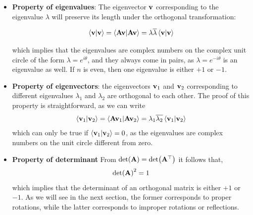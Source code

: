 \documentclass[12pt]{article}
\begin{document}
\begin{itemize}
  \item \textbf{Property of eigenvalues}: The eigenvector $\vb{v}$ corresponding to the
        eigenvalue $\lambda$ will preserve its length under the orthogonal transformation:

        \[
          \ip{\vb{v}}{\vb{v}} = \ip{\vb{A}\vb{v}}{\vb{A}\vb{v}} = \lambda\overline{\lambda}\ip{\vb{v}}{\vb{v}}
        \]

        which implies that the eigenvalues are complex numbers on the complex unit circle of
        the form $\lambda = e^{i\theta}$, and they always come in pairs, as
        $\lambda = e^{-i\theta}$ is an eigenvalue as well. If $n$ is even, then one eigenvalue
        is either $+1$ or $-1$.

  \item \textbf{Property of eigenvectors}: the eigenvectors $\vb{v}_1$ and $\vb{v}_2$
        corresponding to different eigenvalues $\lambda_1$ and $\lambda_2$ are orthogonal to
        each other. The proof of this property is straightforward, as we can write
        \[
          \ip{\vb{v}_1}{\vb{v}_2} = \ip{\vb{A}\vb{v}_1}{\vb{A}\vb{v}_2} = \lambda_1\overline{\lambda_2}\ip{\vb{v}_1}{\vb{v}_2}
        \]
        which can only be true if $\ip{\vb{v}_1}{\vb{v}_2} = 0$, as the eigenvalues are
        complex numbers on the unit circle different from zero.

  \item \textbf{Property of determinant} From $\det(\vb{A}) = \det(\vb{A}^\top)$ it follows
        that,
        \[
          \det(\vb{A})^2 = 1
        \]
        which implies that the determinant of an orthogonal matrix is either $+1$ or $-1$.
        As we will see in the next section, the former corresponds to proper rotations, while
        the latter corresponds to improper rotations or reflections.


\end{itemize}
\end{document}
